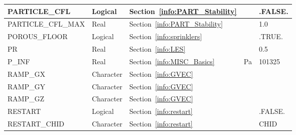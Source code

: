 \documentclass[11pt]{book}
\begin{document}
\begin{longtable}{@{\extracolsep{\fill}}|l|l|l|l|l|}
{\ct PARTICLE\_CFL}                             & Logical       & Section~\ref{info:PART_Stability}                     &               & {\ct .FALSE.}     \\ \hline
{\ct PARTICLE\_CFL\_MAX}                        & Real          & Section~\ref{info:PART_Stability}                     &               & 1.0               \\ \hline
{\ct POROUS\_FLOOR}                             & Logical       & Section~\ref{info:sprinklers}                         &               & {\ct .TRUE.}      \\ \hline
{\ct PR}                                        & Real          & Section~\ref{info:LES}                                &               & 0.5               \\ \hline
{\ct P\_INF}                                    & Real          & Section~\ref{info:MISC_Basics}                        & Pa            & 101325            \\ \hline
{\ct RAMP\_GX}                                  & Character     & Section~\ref{info:GVEC}                               &               &                   \\ \hline
{\ct RAMP\_GY}                                  & Character     & Section~\ref{info:GVEC}                               &               &                   \\ \hline
{\ct RAMP\_GZ}                                  & Character     & Section~\ref{info:GVEC}                               &               &                   \\ \hline
{\ct RESTART}                                   & Logical       & Section~\ref{info:restart}                            &               & {\ct .FALSE.}     \\ \hline
{\ct RESTART\_CHID}                             & Character     & Section~\ref{info:restart}                            &               & {\ct CHID}        \\ \hline

\end{longtable}
\end{document}

